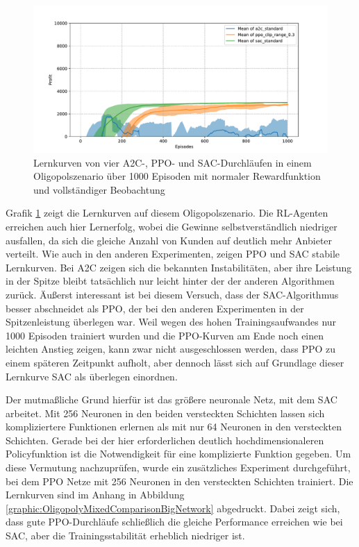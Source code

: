 \begin{figure}[htb]
	\centering
	\includegraphics[width=\textwidth]{main/comparison_oligopoly.pdf}
	\caption{Lernkurven von vier A2C-, PPO- und SAC-Durchläufen in einem Oligopolszenario über 1000 Episoden mit normaler Rewardfunktion und vollständiger Beobachtung}
	\label{graphic:OligopolyComparison}
\end{figure}

Grafik \ref{graphic:OligopolyComparison} zeigt die Lernkurven auf diesem Oligopolszenario.
Die RL-Agenten erreichen auch hier Lernerfolg, wobei die Gewinne selbstverständlich niedriger ausfallen, da sich die gleiche Anzahl von Kunden auf deutlich mehr Anbieter verteilt.
Wie auch in den anderen Experimenten, zeigen PPO und SAC stabile Lernkurven.
Bei A2C zeigen sich die bekannten Instabilitäten, aber ihre Leistung in der Spitze bleibt tatsächlich nur leicht hinter der der anderen Algorithmen zurück.
Äußerst interessant ist bei diesem Versuch, dass der SAC-Algorithmus besser abschneidet als PPO, der bei den anderen Experimenten in der Spitzenleistung überlegen war.
Weil wegen des hohen Trainingsaufwandes nur 1000 Episoden trainiert wurden und die PPO-Kurven am Ende noch einen leichten Anstieg zeigen, kann zwar nicht ausgeschlossen werden, dass PPO zu einem späteren Zeitpunkt aufholt, aber dennoch lässt sich auf Grundlage dieser Lernkurve SAC als überlegen einordnen.

Der mutmaßliche Grund hierfür ist das größere neuronale Netz, mit dem SAC arbeitet.
Mit 256 Neuronen in den beiden versteckten Schichten lassen sich kompliziertere Funktionen erlernen als mit nur 64 Neuronen in den versteckten Schichten.
Gerade bei der hier erforderlichen deutlich hochdimensionaleren Policyfunktion ist die Notwendigkeit für eine komplizierte Funktion gegeben.
Um diese Vermutung nachzuprüfen, wurde ein zusätzliches Experiment durchgeführt, bei dem PPO Netze mit 256 Neuronen in den versteckten Schichten trainiert.
Die Lernkurven sind im Anhang in Abbildung \ref{graphic:OligopolyMixedComparisonBigNetwork} abgedruckt.
Dabei zeigt sich, dass gute PPO-Durchläufe schließlich die gleiche Performance erreichen wie bei SAC, aber die Trainingsstabilität erheblich niedriger ist.

